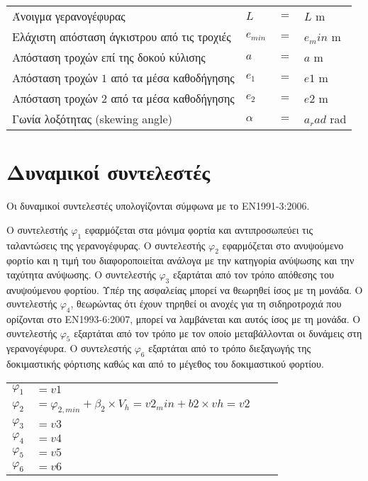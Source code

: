 \begin{tabular}{llcl}
    Άνοιγμα γερανογέφυρας                         &$L$          &$=$ &${{ L }}$ m \\
    Ελάχιστη απόσταση άγκιστρου από τις τροχιές   &$e_{min}$    &$=$ &${{ e_min }}$ m \\
    Απόσταση τροχών επί της δοκού κύλισης         &$a$          &$=$ &${{ a }}$ m \\
    Απόσταση τροχών $1$ από τα μέσα καθοδήγησης   &$e_1$        &$=$ &${{ e1 }}$ m \\
    Απόσταση τροχών $2$ από τα μέσα καθοδήγησης   &$e_2$        &$=$ &${{ e2 }}$ m \\
    Γωνία λοξότητας (skewing angle)               &$α$          &$=$ &${{ a_rad }}$ rad
\end{tabular}

\section{Δυναμικοί συντελεστές}
Οι δυναμικοί συντελεστές υπολογίζονται σύμφωνα με το ΕΝ1991-3:2006.

Ο συντελεστής $φ_1$ εφαρμόζεται στα μόνιμα φορτία και αντιπροσωπεύει τις ταλαντώσεις της
γερανογέφυρας. Ο συντελεστής $φ_2$ εφαρμόζεται στο ανυψούμενο φορτίο και η τιμή του διαφοροποιείται
ανάλογα με την κατηγορία ανύψωσης και την ταχύτητα ανύψωσης. Ο συντελεστής $φ_3$ εξαρτάται από τον
τρόπο απόθεσης του ανυψούμενου φορτίου. Υπέρ της ασφαλείας μπορεί να θεωρηθεί ίσος με τη μονάδα.
Ο συντελεστής $φ_4$, θεωρώντας ότι έχουν τηρηθεί οι ανοχές για τη σιδηροτροχιά που ορίζονται στο
ΕΝ1993-6:2007, μπορεί να λαμβάνεται και αυτός ίσος με τη μονάδα. Ο συντελεστής $φ_5$ εξαρτάται από
τον τρόπο με τον οποίο μεταβάλλονται οι δυνάμεις στη γερανογέφυρα. Ο συντελεστής $φ_6$ εξαρτάται από
το τρόπο διεξαγωγής της δοκιμαστικής φόρτισης καθώς και από το μέγεθος του δοκιμαστικού φορτίου.

\begin{tabular}{llcr}
    $φ_1$ &$= {{ v1 }} $ \\
    $φ_2$ &$= φ_{2,min} + β_2 \times V_h = {{ v2_min }} + {{ b2 }} \times {{ vh }} = {{ v2 }} $ \\
    $φ_3$ &$= {{ v3 }} $ \\
    $φ_4$ &$= {{ v4 }} $ \\
    $φ_5$ &$= {{ v5 }} $ \\
    $φ_6$ &$= {{ v6 }} $
\end{tabular}
